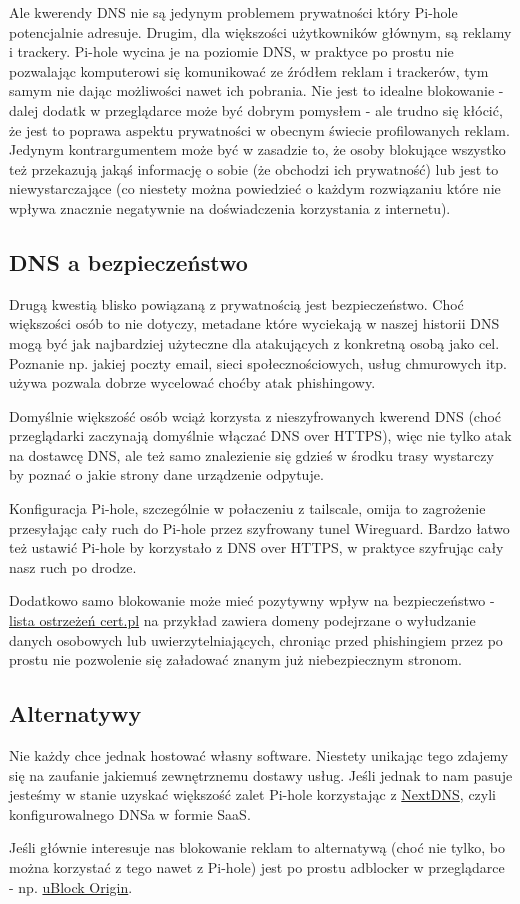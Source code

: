 \documentclass[../main.tex]{subfiles}
\begin{document}
Ale kwerendy DNS nie są jedynym problemem prywatności który Pi-hole potencjalnie adresuje. Drugim, dla większości użytkowników głównym, są reklamy i trackery. Pi-hole wycina je na poziomie DNS, w praktyce po prostu nie pozwalając komputerowi się komunikować ze źródłem reklam i trackerów, tym samym nie dając możliwości nawet ich pobrania. Nie jest to idealne blokowanie - dalej dodatk w przeglądarce może być dobrym pomysłem - ale trudno się kłócić, że jest to poprawa aspektu prywatności w obecnym świecie profilowanych reklam. Jedynym kontrargumentem może być w zasadzie to, że osoby blokujące wszystko też przekazują jakąś informację o sobie (że obchodzi ich prywatność) lub jest to niewystarczające (co niestety można powiedzieć o każdym rozwiązaniu które nie wpływa znacznie negatywnie na doświadczenia korzystania z internetu).

\subsection{DNS a bezpieczeństwo}

Drugą kwestią blisko powiązaną z prywatnością jest bezpieczeństwo. Choć większości osób to nie dotyczy, metadane które wyciekają w naszej historii DNS mogą być jak najbardziej użyteczne dla atakujących z konkretną osobą jako cel. Poznanie np. jakiej poczty email, sieci społecznościowych, usług chmurowych itp. używa pozwala dobrze wycelować choćby atak phishingowy.

Domyślnie większość osób wciąż korzysta z nieszyfrowanych kwerend DNS (choć przeglądarki zaczynają domyślnie włączać DNS over HTTPS), więc nie tylko atak na dostawcę DNS, ale też samo znalezienie się gdzieś w środku trasy wystarczy by poznać o jakie strony dane urządzenie odpytuje.

Konfiguracja Pi-hole, szczególnie w połaczeniu z tailscale, omija to zagrożenie przesyłając cały ruch do Pi-hole przez szyfrowany tunel Wireguard. Bardzo łatwo też ustawić Pi-hole by korzystało z DNS over HTTPS, w praktyce szyfrując cały nasz ruch po drodze.

Dodatkowo samo blokowanie może mieć pozytywny wpływ na bezpieczeństwo - \href{https://cert.pl/posts/2020/03/ostrzezenia_phishing/}{lista ostrzeżeń cert.pl} na przykład zawiera domeny podejrzane o wyłudzanie danych osobowych lub uwierzytelniających, chroniąc przed phishingiem przez po prostu nie pozwolenie się załadować znanym już niebezpiecznym stronom.

\subsection{Alternatywy}
Nie każdy chce jednak hostować własny software. Niestety unikając tego zdajemy się na zaufanie jakiemuś zewnętrznemu dostawy usług. Jeśli jednak to nam pasuje jesteśmy w stanie uzyskać większość zalet Pi-hole korzystając z \href{https://nextdns.io/}{NextDNS}, czyli konfigurowalnego DNSa w formie SaaS.

Jeśli głównie interesuje nas blokowanie reklam to alternatywą (choć nie tylko, bo można korzystać z tego nawet z Pi-hole) jest po prostu adblocker w przeglądarce - np. \href{https://github.com/gorhill/uBlock}{uBlock Origin}.
\end{document}
